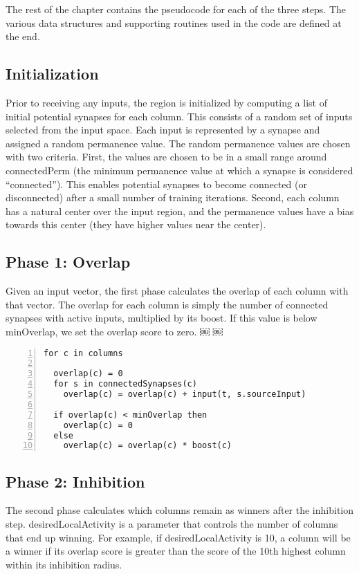 \documentclass{report}
\begin{document}
The rest of the chapter contains the pseudocode for each of the three
steps. The various data structures and supporting routines used in the
code are defined at the end.

\subsection*{Initialization}

Prior to receiving any inputs, the region is initialized by computing
a list of initial potential synapses for each column. This consists of
a random set of inputs selected from the input space. Each input is
represented by a synapse and assigned a random permanence value. The
random permanence values are chosen with two criteria. First, the
values are chosen to be in a small range around connectedPerm (the
minimum permanence value at which a synapse is considered
``connected''). This enables potential synapses to become connected (or
disconnected) after a small number of training iterations. Second,
each column has a natural center over the input region, and the
permanence values have a bias towards this center (they have higher
values near the center).

\subsection*{Phase 1: Overlap}

Given an input vector, the first phase calculates the overlap of each
column with that vector. The overlap for each column is simply the
number of connected synapses with active inputs, multiplied by its
boost. If this value is below minOverlap, we set the overlap score to
zero.  ￼ ￼

\begin{lstlisting}[numbers=left]
for c in columns

  overlap(c) = 0
  for s in connectedSynapses(c)
    overlap(c) = overlap(c) + input(t, s.sourceInput)

  if overlap(c) < minOverlap then
    overlap(c) = 0
  else
    overlap(c) = overlap(c) * boost(c)
\end{lstlisting}

\subsection*{Phase 2: Inhibition}
The second phase calculates which columns remain as winners after the
inhibition step. desiredLocalActivity is a parameter that controls the
number of columns that end up winning. For example, if
desiredLocalActivity is 10, a column will be a winner if its overlap
score is greater than the score of the 10th highest column within its
inhibition radius.
\end{document}

